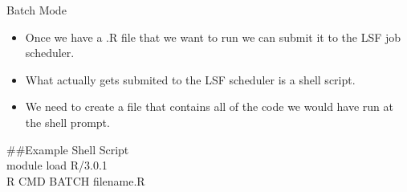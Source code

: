 \begin{frame}{Batch Mode}
\begin{itemize}
\item Once we have a .R file that we want to run we can submit it to the LSF job scheduler.  
\item What actually gets submited to the LSF scheduler is a shell script.  
\item We need to create a file that contains all of the code we would have run at the shell prompt.  
\end{itemize}
##Example Shell Script\\
module load R/3.0.1\\
R CMD BATCH filename.R\\
\end{frame}




